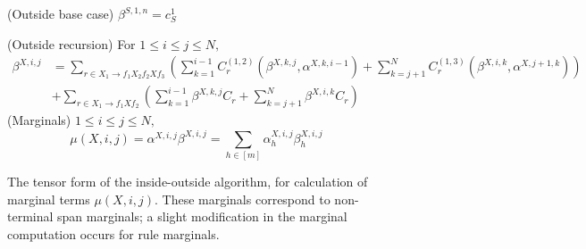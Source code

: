 \documentclass[twoside,11pt]{article}
\begin{document}
\begin{figure}[h]
{{(Outside base case)
$
\beta^{S, 1, n} = c^1_S
$

(Outside recursion)
For $1 \leq i \leq j \leq N, \;\;
$
\begin{align*}
\beta^{X, i, j} &=
\sum_{r \in X_1 \rightarrow f_1 X_2 f_2 X f_3} 
\left (\sum_{k=1}^{i-1} 
C^{(1,2)}_{r}(\beta^{X, k, j}, \alpha^{X, k, i-1}) 
 + \sum_{k=j+1}^{N} 
C_{r}^{(1,3)}(\beta^{X, i, k}, \alpha^{X, j+1, k})
\right) \\
& + \sum_{r\in X_1 \rightarrow f_1 X f_2} \left( \sum_{k=1}^{i-1} \beta^{X, k,
    j} C_r + \sum_{k=j+1}^N \beta^{X, i, k} C_r
\right )
\end{align*}
\hbox{(Marginals)}
$
1 \leq i \leq j \leq N,\;\;
$
\[
\mu(X, i, j) = \alpha^{X, i, j} \beta^{X, i, j}
= \sum_{h \in [m]} \alpha^{X, i, j}_h \beta^{X, i, j}_h
\]
}}
\caption{\small The tensor form of the inside-outside algorithm, for
  calculation of marginal terms $\mu(X, i, j)$.  These marginals correspond to non-terminal span marginals; a slight modification in the marginal computation occurs for rule marginals.} 
\label{fig:spio2}
\end{figure}
\end{document}
